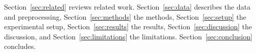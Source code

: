 Section~\ref{sec:related} reviews related work. Section~\ref{sec:data} describes the data and preprocessing, Section~\ref{sec:methods} the methods, Section~\ref{sec:setup} the experimental setup, Section~\ref{sec:results} the results, Section~\ref{sec:discussion} the discussion, and Section~\ref{sec:limitations} the limitations. Section~\ref{sec:conclusion} concludes.
